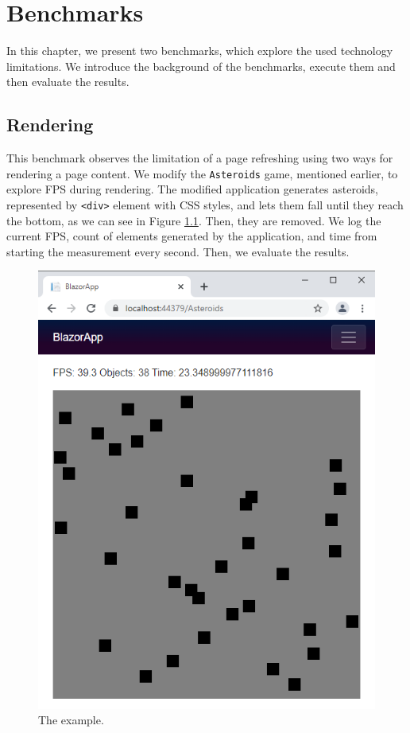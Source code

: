 \chapter{Benchmarks}

In this chapter, we present two benchmarks, which explore the used technology limitations.
We introduce the background of the benchmarks, execute them and then evaluate the results.

\section{Rendering}

This benchmark observes the limitation of a page refreshing using two ways for rendering a page content.
We modify the \texttt{Asteroids} game, mentioned earlier, to explore FPS during rendering.
The modified application generates asteroids, represented by \texttt{<div>} element with CSS styles, and lets them fall until they reach the bottom, as we can see in Figure \ref{img33:benchmark}.
Then, they are removed.
We log the current FPS, count of elements generated by the application, and time from starting the measurement every second.
Then, we evaluate the results.
\par
\begin{figure}\centering
\includegraphics[scale=0.7]{./img/BenchmarkRendering}
\caption{The example.}
\label{img33:benchmark}
\end{figure} 
